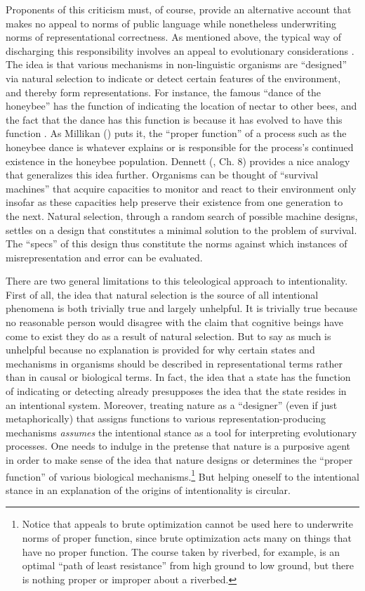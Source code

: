 Proponents of this criticism must, of course, provide an alternative account that makes no appeal to norms of public language while nonetheless underwriting norms of representational correctness. As mentioned above, the typical way of discharging this responsibility involves an appeal to evolutionary considerations \citep{Millikan:1989,Millikan:2005,Dennett:1987,Dennett:2010}. The idea is that various mechanisms in non-linguistic organisms are ``designed'' via natural selection to indicate or detect certain features of the environment, and thereby form representations. For instance, the famous ``dance of the honeybee'' has the function of indicating the location of nectar to other bees, and the fact that the dance has this function is because it has evolved to have this function \citep[see][]{Sellars:1954}. As Millikan (\citeyear{Millikan:1989}) puts it, the ``proper function'' of a process such as the honeybee dance is whatever explains or is responsible for the process's continued existence in the honeybee population. Dennett (\citeyear{Dennett:1987}, Ch. 8) provides a nice analogy that generalizes this idea further. Organisms can be thought of ``survival machines'' that acquire capacities to monitor and react to their environment only insofar as these capacities help preserve their existence from one generation to the next. Natural selection, through a random search of possible machine designs, settles on a design that constitutes a minimal solution to the problem of survival. The ``specs'' of this design thus constitute the norms against which instances of misrepresentation and error can be evaluated. 

There are two general limitations to this teleological approach to intentionality. First of all, the idea that natural selection is the source of all intentional phenomena is both trivially true and largely unhelpful. It is trivially true because no reasonable person would disagree with the claim that cognitive beings have come to exist they do as a result of natural selection. But to say as much is unhelpful because no explanation is provided for why certain states and mechanisms in organisms should be described in representational terms rather than in causal or biological terms. In fact, the idea that a state has the function of indicating or detecting already presupposes the idea that the state resides in an intentional system. Moreover, treating nature as a ``designer'' (even if just metaphorically) that assigns functions to various representation-producing mechanisms \textit{assumes} the intentional stance as a tool for interpreting evolutionary processes. One needs to indulge in the pretense that nature is a purposive agent in order to make sense of the idea that nature designs or determines the ``proper function'' of various biological mechanisms.\footnote{Notice that appeals to brute optimization cannot be used here to underwrite norms of proper function, since brute optimization acts many on things that have no proper function. The course taken by riverbed, for example, is an optimal ``path of least resistance'' from high ground to low ground, but there is nothing proper or improper about a riverbed.} But helping oneself to the intentional stance in an explanation of the origins of intentionality is circular. 

